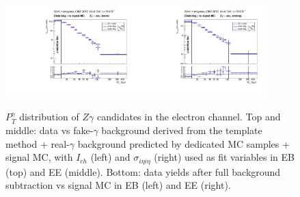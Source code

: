 \begin{figure}[htb]
\begin{center}
\includegraphics[width=0.45\textwidth]{../figs/figs_v11/ELECTRON_ZGamma/PrepareYields/c_BkgSubtrDATAvsSIGMC_c_ELECTRON_ZGamma__UNblind__Barrel__phoEt.pdf}\includegraphics[width=0.45\textwidth]{../figs/figs_v11/ELECTRON_ZGamma/PrepareYields/c_BkgSubtrDATAvsSIGMC_c_ELECTRON_ZGamma__UNblind__Endcap__phoEt.pdf}\\
  \caption{$P_T^{\gamma}$ distribution of $Z\gamma$ candidates in the electron channel. Top and middle: data vs fake-$\gamma$ background derived from the template method + real-$\gamma$ background predicted by dedicated MC samples + signal MC, with $I_{ch}$ (left) and $\sigma_{i\eta i\eta}$ (right) used as fit variables in EB (top) and EE (middle). Bottom: data yields after full background subtraction vs signal MC in EB (left) and EE (right).}
  \label{fig:DDvsMC_Zg_Data_ELECTRON}
  \end{center}
\end{figure}

